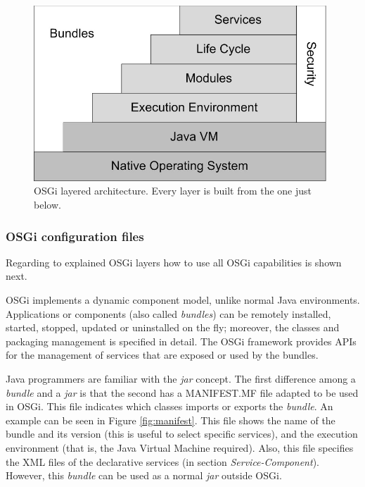 \begin{figure}
\centering
\includegraphics[width=26pc]{gfx/soa/osgi-oficial.jpg}
\caption{OSGi layered architecture. Every layer is built from the one just below.}
\label{fig:osgi-original}
\end{figure}






\subsubsection{OSGi configuration files}
Regarding to explained OSGi layers how to use all OSGi capabilities is shown next. 

OSGi implements a dynamic component model, unlike normal Java
environments. Applications or components (also called
\emph{bundles}) can be remotely installed, started, stopped, updated
or uninstalled on the fly; moreover, the classes and
packaging management is specified in detail. The OSGi framework provides
APIs for the management of services that are exposed or used by the
bundles.

Java programmers are familiar with the {\em jar} concept. The first difference among a {\em bundle} and a {\em jar} is that the second has a MANIFEST.MF file adapted to be used in OSGi. This file indicates which classes imports or exports the {\em bundle}. An example can be seen in Figure \ref{fig:manifest}. This file shows the name of the bundle and its version (this is useful to select specific services), and the execution environment (that is, the Java Virtual Machine required). Also, this file specifies the XML files of the declarative services (in section {\em Service-Component}). However, this {\em bundle} can be used as a normal {\em jar} outside OSGi.

